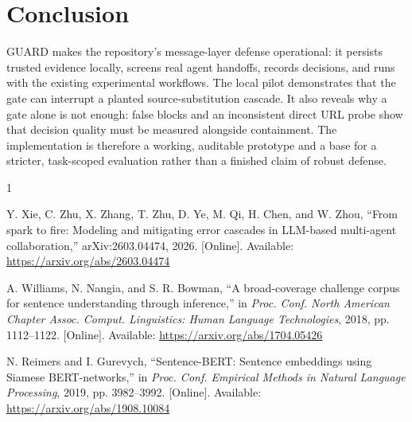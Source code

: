 \documentclass[journal]{IEEEtran}
\begin{document}
\section{Conclusion}

GUARD makes the repository's message-layer defense operational: it persists trusted evidence locally, screens real agent handoffs, records decisions, and runs with the existing experimental workflows. The local pilot demonstrates that the gate can interrupt a planted source-substitution cascade. It also reveals why a gate alone is not enough: false blocks and an inconsistent direct URL probe show that decision quality must be measured alongside containment. The implementation is therefore a working, auditable prototype and a base for a stricter, task-scoped evaluation rather than a finished claim of robust defense.

\begin{thebibliography}{1}

Y. Xie, C. Zhu, X. Zhang, T. Zhu, D. Ye, M. Qi, H. Chen, and W. Zhou,
``From spark to fire: Modeling and mitigating error cascades in LLM-based multi-agent collaboration,'' arXiv:2603.04474, 2026. [Online]. Available: \url{https://arxiv.org/abs/2603.04474}

A. Williams, N. Nangia, and S. R. Bowman, ``A broad-coverage challenge corpus for sentence understanding through inference,'' in \emph{Proc. Conf. North American Chapter Assoc. Comput. Linguistics: Human Language Technologies}, 2018, pp. 1112--1122. [Online]. Available: \url{https://arxiv.org/abs/1704.05426}

N. Reimers and I. Gurevych, ``Sentence-BERT: Sentence embeddings using Siamese BERT-networks,'' in \emph{Proc. Conf. Empirical Methods in Natural Language Processing}, 2019, pp. 3982--3992. [Online]. Available: \url{https://arxiv.org/abs/1908.10084}

\end{thebibliography}
\end{document}
